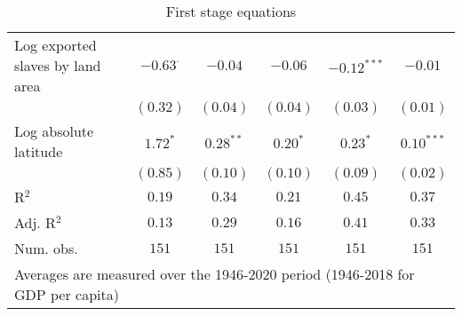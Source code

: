 \begin{sidewaystable}
\begin{center}
{\begin{tabular}{l c c c c c}
Log exported slaves by land area & $-0.63^{\cdot}$ & $-0.04$        & $-0.06$      & $-0.12^{***}$   & $-0.01$         \\
                                 & $(0.32)$        & $(0.04)$       & $(0.04)$     & $(0.03)$        & $(0.01)$        \\
Log absolute latitude            & $1.72^{*}$      & $0.28^{**}$    & $0.20^{*}$   & $0.23^{*}$      & $0.10^{***}$    \\
                                 & $(0.85)$        & $(0.10)$       & $(0.10)$     & $(0.09)$        & $(0.02)$        \\
\hline
R$^2$                            & $0.19$          & $0.34$         & $0.21$       & $0.45$          & $0.37$          \\
Adj. R$^2$                       & $0.13$          & $0.29$         & $0.16$       & $0.41$          & $0.33$          \\
Num. obs.                        & $151$           & $151$          & $151$        & $151$           & $151$           \\
\hline
\multicolumn{6}{l}{\scriptsize{Averages are measured over the 1946-2020 period (1946-2018 for GDP per capita)}}
\end{tabular}
}
\caption{First stage equations}
\label{MediationTableRob}
\end{center}
\end{sidewaystable}
